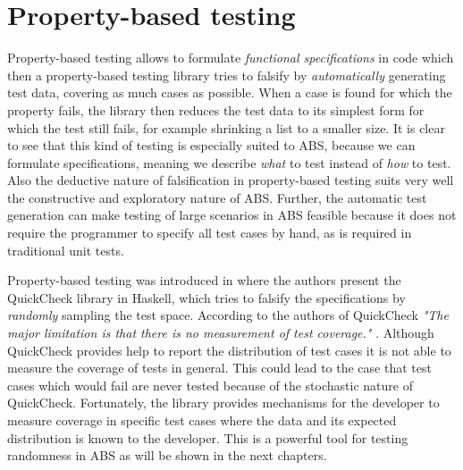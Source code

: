 \section{Property-based testing}
\label{sec:proptesting}
Property-based testing allows to formulate \textit{functional specifications} in code which then a property-based testing library tries to falsify by \textit{automatically} generating test data, covering as much cases as possible. When a case is found for which the property fails, the library then reduces the test data to its simplest form for which the test still fails, for example shrinking a list to a smaller size. It is clear to see that this kind of testing is especially suited to ABS, because we can formulate specifications, meaning we describe \textit{what} to test instead of \textit{how} to test. Also the deductive nature of falsification in property-based testing suits very well the constructive and exploratory nature of ABS. Further, the automatic test generation can make testing of large scenarios in ABS feasible because it does not require the programmer to specify all test cases by hand, as is required in traditional unit tests.

Property-based testing was introduced in \cite{claessen_quickcheck_2000,claessen_testing_2002} where the authors present the QuickCheck library in Haskell, which tries to falsify the specifications by \textit{randomly} sampling the test space. %
According to the authors of QuickCheck \textit{"The major limitation is that there is no measurement of test coverage."} \cite{claessen_quickcheck_2000}. Although QuickCheck provides help to report the distribution of test cases it is not able to measure the coverage of tests in general. This could lead to the case that test cases which would fail are never tested because of the stochastic nature of QuickCheck. Fortunately, the library provides mechanisms for the developer to measure coverage in specific test cases where the data and its expected distribution is known to the developer. This is a powerful tool for testing randomness in ABS as will be shown in the next chapters.

